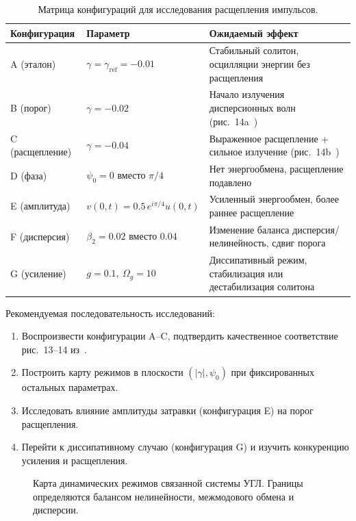 \documentclass{article}
\begin{document}
\begin{table}[htbp]
    \centering
    \renewcommand{\arraystretch}{1.3}
    \begin{tabular}{llp{7cm}}
        \hline
        \textbf{Конфигурация} & \textbf{Параметр} & \textbf{Ожидаемый эффект} \\
        \hline
        A (эталон)   & \(\gamma = \gamma_{\mathrm{ref}} = -0.01\)     & Стабильный солитон, осцилляции энергии без расщепления \\
        B (порог)    & \(\gamma = -0.02\)                              & Начало излучения дисперсионных волн (рис.~14a~\cite{main}) \\
        C (расщепление) & \(\gamma = -0.04\)                           & Выраженное расщепление + сильное излучение (рис.~14b~\cite{main}) \\
        D (фаза)     & \(\psi_0 = 0\) вместо \(\pi/4\)                 & Нет энергообмена, расщепление подавлено \\
        E (амплитуда)& \(v(0,t) = 0.5\,e^{i\pi/4}u(0,t)\)             & Усиленный энергообмен, более раннее расщепление \\
        F (дисперсия)& \(\beta_2 = 0.02\) вместо \(0.04\)              & Изменение баланса дисперсия/нелинейность, сдвиг порога \\
        G (усиление) & \(g = 0.1,\ \Omega_g = 10\)                     & Диссипативный режим, стабилизация или дестабилизация солитона \\
        \hline
    \end{tabular}
    \caption{Матрица конфигураций для исследования расщепления импульсов.}
    \label{tab:splitting_configs}
\end{table}

Рекомендуемая последовательность исследований:
\begin{enumerate}
    \item Воспроизвести конфигурации A--C, подтвердить качественное соответствие рис.~13--14 из~\cite{main}.
    \item Построить карту режимов в плоскости \((|\gamma|, \psi_0)\) при фиксированных остальных параметрах.
    \item Исследовать влияние амплитуды затравки (конфигурация E) на порог расщепления.
    \item Перейти к диссипативному случаю (конфигурация G) и изучить конкуренцию усиления и расщепления.
\end{enumerate}

\begin{figure}[htbp]
    \centering
    \caption{Карта динамических режимов связанной системы УГЛ. Границы определяются балансом нелинейности, межмодового обмена и дисперсии.}
    \label{fig:regime_map}
\end{figure}
\end{document}
